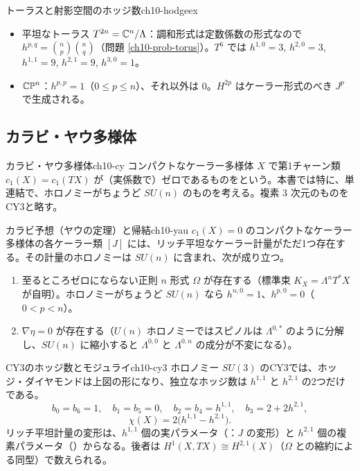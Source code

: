 \begin{myex}{トーラスと射影空間のホッジ数}{ch10-hodgeex}
\begin{itemize}
\item 平坦なトーラス $T^{2n}=\mathbb{C}^n/\Lambda$：調和形式は定数係数の形式なので $h^{p,q}=\binom{n}{p}\binom{n}{q}$（問題 \ref{ch10-prob-torus}）。$T^6$ では $h^{1,0}=3$, $h^{2,0}=3$, $h^{1,1}=9$, $h^{2,1}=9$, $h^{3,0}=1$。
\item $\mathbb{CP}^n$：$h^{p,p}=1$（$0\le p\le n$）、それ以外は $0$。$H^{2p}$ はケーラー形式のべき $J^p$ で生成される。
\end{itemize}
\end{myex}

\subsection{カラビ・ヤウ多様体}

\begin{mydef}{カラビ・ヤウ多様体}{ch10-cy}
コンパクトなケーラー多様体 $X$ で第1チャーン類 $c_1(X)=c_1(TX)$ が（実係数で）ゼロであるものをという。本書では特に、単連結で、ホロノミーがちょうど $SU(n)$ のものを考える。複素 $3$ 次元のものをCY3と略す。
\end{mydef}

\begin{mythm}{カラビ予想（ヤウの定理）と帰結}{ch10-yau}
$c_1(X)=0$ のコンパクトなケーラー多様体の各ケーラー類 $[J]$ には、リッチ平坦なケーラー計量がただ1つ存在する。その計量のホロノミーは $SU(n)$ に含まれ、次が成り立つ。
\begin{enumerate}
\item 至るところゼロにならない正則 $n$ 形式 $\Omega$ が存在する（標準束 $K_X=\Lambda^nT^*X$ が自明）。ホロノミーがちょうど $SU(n)$ なら $h^{n,0}=1$、$h^{p,0}=0$（$0<p<n$）。
\item {} $\nabla\eta=0$ が存在する（$U(n)$ ホロノミーではスピノルは $\Lambda^{0,*}$ のように分解し、$SU(n)$ に縮小すると $\Lambda^{0,0}$ と $\Lambda^{0,n}$ の成分が不変になる）。
\end{enumerate}
\end{mythm}

\begin{myprop}{CY3のホッジ数とモジュライ}{ch10-cy3}
ホロノミー $SU(3)$ のCY3では、ホッジ・ダイヤモンドは上図の形になり、独立なホッジ数は $h^{1,1}$ と $h^{2,1}$ の2つだけである。
\[
b_0=b_6=1,\quad b_1=b_5=0,\quad b_2=b_4=h^{1,1},\quad b_3=2+2h^{2,1},
\]
\[
\chi(X)=2\bigl(h^{1,1}-h^{2,1}\bigr).
\]
リッチ平坦計量の変形は、$h^{1,1}$ 個の実パラメータ（：$J$ の変形）と $h^{2,1}$ 個の複素パラメータ（）からなる。後者は $H^1(X,TX)\cong H^{2,1}(X)$（$\Omega$ との縮約による同型）で数えられる。
\end{myprop}

